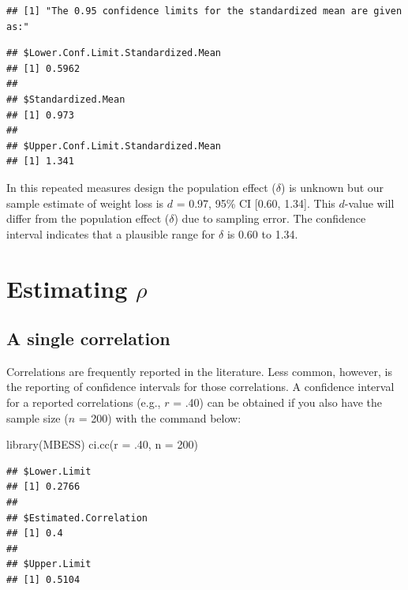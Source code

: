 \documentclass[
]{krantz}
\makeatletter
\newenvironment{Shaded}{\begin{snugshade}}{\end{snugshade}}
\newcommand{\AttributeTok}[1]{\textcolor[rgb]{0.61,0.61,0.61}{#1}}
\newcommand{\DecValTok}[1]{\textcolor[rgb]{0.06,0.06,0.06}{#1}}
\newcommand{\FunctionTok}[1]{\textcolor[rgb]{0,0,0}{#1}}
\newcommand{\NormalTok}[1]{#1}
\newenvironment{kframe}{%
\medskip{}
\setlength{\fboxsep}{.8em}
 \def\at@end@of@kframe{}%
 \ifinner\ifhmode%
  \def\at@end@of@kframe{\end{minipage}}%
  \begin{minipage}{\columnwidth}%
 \fi\fi%
 \def\FrameCommand##1{\hskip\@totalleftmargin \hskip-\fboxsep
 \colorbox{shadecolor}{##1}\hskip-\fboxsep
     \hskip-\linewidth \hskip-\@totalleftmargin \hskip\columnwidth}%
 \MakeFramed {\advance\hsize-\width
   \@totalleftmargin\z@ \linewidth\hsize
   \@setminipage}}%
 {\par\unskip\endMakeFramed%
 \at@end@of@kframe}
\renewenvironment{Shaded}{\begin{kframe}}{\end{kframe}}
\makeatother
\begin{document}
\begin{verbatim}
## [1] "The 0.95 confidence limits for the standardized mean are given as:"
\end{verbatim}

\begin{verbatim}
## $Lower.Conf.Limit.Standardized.Mean
## [1] 0.5962
## 
## $Standardized.Mean
## [1] 0.973
## 
## $Upper.Conf.Limit.Standardized.Mean
## [1] 1.341
\end{verbatim}

In this repeated measures design the population effect (\(\delta\)) is unknown but our sample estimate of weight loss is \(d\) = 0.97, 95\% CI {[}0.60, 1.34{]}. This \(d\)-value will differ from the population effect (\(\delta\)) due to sampling error. The confidence interval indicates that a plausible range for \(\delta\) is 0.60 to 1.34.

\hypertarget{estimating-rho-1}{%
\section{\texorpdfstring{Estimating \(\rho\)}{Estimating \textbackslash rho}}\label{estimating-rho-1}}

\hypertarget{a-single-correlation}{%
\subsection{A single correlation}\label{a-single-correlation}}

Correlations are frequently reported in the literature. Less common, however, is the reporting of confidence intervals for those correlations. A confidence interval for a reported correlations (e.g., \(r\) = .40) can be obtained if you also have the sample size (\(n\) = 200) with the command below:

\begin{Shaded}
\begin{Highlighting}[]
\FunctionTok{library}\NormalTok{(MBESS)}
\FunctionTok{ci.cc}\NormalTok{(}\AttributeTok{r =}\NormalTok{ .}\DecValTok{40}\NormalTok{, }\AttributeTok{n =} \DecValTok{200}\NormalTok{)}
\end{Highlighting}
\end{Shaded}

\begin{verbatim}
## $Lower.Limit
## [1] 0.2766
## 
## $Estimated.Correlation
## [1] 0.4
## 
## $Upper.Limit
## [1] 0.5104
\end{verbatim}
\end{document}
